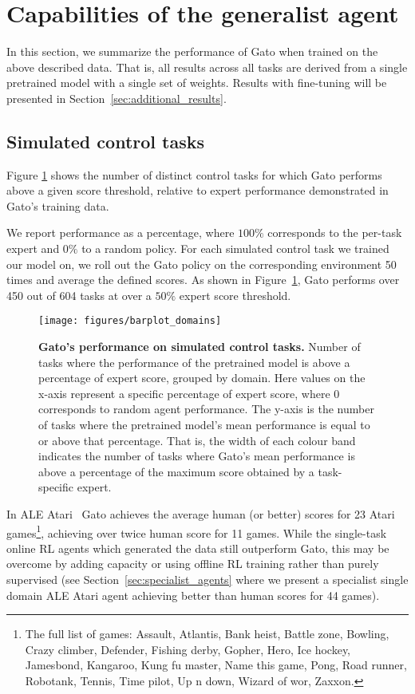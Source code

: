 \documentclass[10pt]{article} \usepackage[accepted]{tmlr}
\newcommand{\model}{{Gato}}
\newcommand{\atari}{{ALE Atari}}
\begin{document}
\section{Capabilities of the generalist agent}
\label{sec:results}


In this section, we summarize the performance of \model{} when trained on the above described data. That is, all results across all tasks are derived from a single pretrained model with a single set of weights. Results with fine-tuning will be presented in Section~\ref{sec:additional_results}.
\vskip 0.4cm
\subsection{Simulated control tasks}\label{sec:simulated_control_task}
\vskip 0.2cm
Figure \ref{fig:indist_barplot} shows the number of distinct control tasks for which \model{} performs above a given score threshold, relative to expert performance demonstrated in \model{}'s training data.


We report performance as a percentage, where $100\%$ corresponds to the per-task expert and $0\%$ to a random policy.
For each simulated control task we trained our model on, we roll out the \model{} policy on the corresponding environment 50 times and average the defined scores.
As shown in Figure~\ref{fig:indist_barplot}, \model{} performs over 450 out of 604 tasks at over a $50\%$ expert score threshold.


\begin{figure}[t]
    \centering
    \texttt{[image: figures/barplot\_domains]}
    \caption{
    {\bf \model{}'s performance on simulated control tasks.} Number of tasks where the performance of the pretrained model is above a percentage of expert score, grouped by domain. Here values on the x-axis represent a specific percentage of expert score, where 0 corresponds to random agent performance. The y-axis is the number of tasks where the pretrained model's mean performance is equal to or above that percentage. That is, the width of each colour band indicates the number of tasks where \model{}'s mean performance is above a percentage of the maximum score obtained by a task-specific expert.
    \label{fig:indist_barplot}}
\end{figure}

In \atari{}~\citep{bellemare2013arcade} \model{} achieves the average human (or better) scores for 23 Atari games\footnote{The full list of games: Assault, Atlantis, Bank heist, Battle zone, Bowling, Crazy climber, Defender, Fishing derby, Gopher, Hero, Ice hockey, Jamesbond, Kangaroo, Kung fu master, Name this game, Pong, Road runner, Robotank, Tennis, Time pilot, Up n down, Wizard of wor, Zaxxon.}, achieving over twice human score for 11 games.
While the single-task online RL agents which generated the data still outperform \model{}, this may be overcome by adding capacity or using offline RL training rather than purely supervised (see Section~\ref{sec:specialist_agents} where we present a specialist single domain \atari{} agent achieving better than human scores for 44 games).
\end{document}
